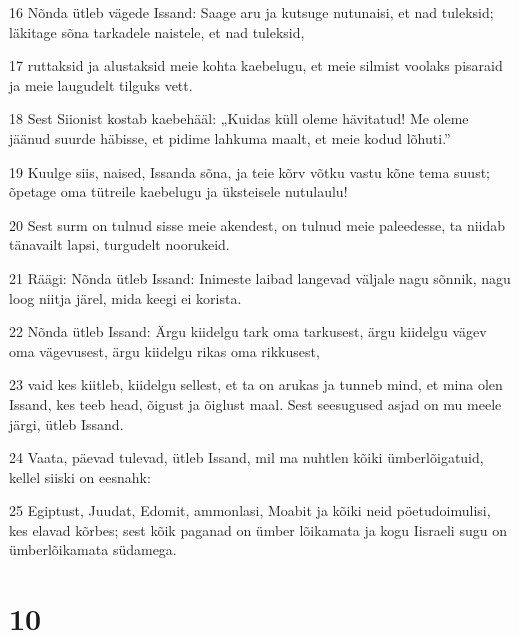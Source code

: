 \par 16 Nõnda ütleb vägede Issand: Saage aru ja kutsuge nutunaisi, et nad tuleksid; läkitage sõna tarkadele naistele, et nad tuleksid,
\par 17 ruttaksid ja alustaksid meie kohta kaebelugu, et meie silmist voolaks pisaraid ja meie laugudelt tilguks vett.
\par 18 Sest Siionist kostab kaebehääl: „Kuidas küll oleme hävitatud! Me oleme jäänud suurde häbisse, et pidime lahkuma maalt, et meie kodud lõhuti.”
\par 19 Kuulge siis, naised, Issanda sõna, ja teie kõrv võtku vastu kõne tema suust; õpetage oma tütreile kaebelugu ja üksteisele nutulaulu!
\par 20 Sest surm on tulnud sisse meie akendest, on tulnud meie paleedesse, ta niidab tänavailt lapsi, turgudelt noorukeid.
\par 21 Räägi: Nõnda ütleb Issand: Inimeste laibad langevad väljale nagu sõnnik, nagu loog niitja järel, mida keegi ei korista.
\par 22 Nõnda ütleb Issand: Ärgu kiidelgu tark oma tarkusest, ärgu kiidelgu vägev oma vägevusest, ärgu kiidelgu rikas oma rikkusest,
\par 23 vaid kes kiitleb, kiidelgu sellest, et ta on arukas ja tunneb mind, et mina olen Issand, kes teeb head, õigust ja õiglust maal. Sest seesugused asjad on mu meele järgi, ütleb Issand.
\par 24 Vaata, päevad tulevad, ütleb Issand, mil ma nuhtlen kõiki ümberlõigatuid, kellel siiski on eesnahk:
\par 25 Egiptust, Juudat, Edomit, ammonlasi, Moabit ja kõiki neid pöetudoimulisi, kes elavad kõrbes; sest kõik paganad on ümber lõikamata ja kogu Iisraeli sugu on ümberlõikamata südamega.

\chapter{10}

